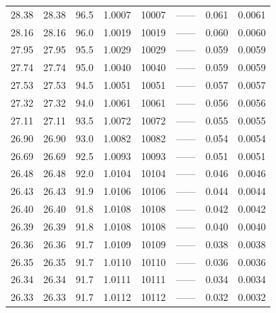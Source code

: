 \documentclass{article}
\begin{document}
\begin{table}[htbp]
\begin{tabular}{cccccccc}
            28.38  & 28.38  & 96.5  & 1.0007  & 10007 & ——    & 0.061  & 0.0061  \\
            28.16  & 28.16  & 96.0  & 1.0019  & 10019 & ——    & 0.060  & 0.0060  \\
            27.95  & 27.95  & 95.5  & 1.0029  & 10029 & ——    & 0.059  & 0.0059  \\
            27.74 & 27.74  & 95.0  & 1.0040  & 10040 & ——    & 0.059  & 0.0059  \\
            27.53 & 27.53  & 94.5  & 1.0051  & 10051 & ——    & 0.057  & 0.0057  \\
            27.32 & 27.32  & 94.0  & 1.0061  & 10061 & ——    & 0.056  & 0.0056  \\
            27.11 & 27.11  & 93.5  & 1.0072  & 10072 & ——    & 0.055  & 0.0055  \\
            26.90  & 26.90  & 93.0  & 1.0082  & 10082 & ——    & 0.054  & 0.0054  \\
            26.69 & 26.69  & 92.5  & 1.0093  & 10093 & ——    & 0.051  & 0.0051  \\
            26.48 & 26.48  & 92.0  & 1.0104  & 10104 & ——    & 0.046  & 0.0046  \\
            26.43 & 26.43  & 91.9  & 1.0106  & 10106 & ——    & 0.044  & 0.0044  \\
            26.40  & 26.40  & 91.8  & 1.0108  & 10108 & ——    & 0.042  & 0.0042  \\
            26.39 & 26.39  & 91.8  & 1.0108  & 10108 & ——    & 0.040  & 0.0040  \\
            26.36 & 26.36  & 91.7  & 1.0109  & 10109 & ——    & 0.038  & 0.0038  \\
            26.35 & 26.35  & 91.7  & 1.0110  & 10110 & ——    & 0.036  & 0.0036  \\
            26.34 & 26.34  & 91.7  & 1.0111  & 10111 & ——    & 0.034  & 0.0034  \\
            26.33 & 26.33  & 91.7  & 1.0112  & 10112 & ——    & 0.032  & 0.0032  \\
            \bottomrule
        \end{tabular}%
    \end{table}%

    \clearpage
\end{document}
